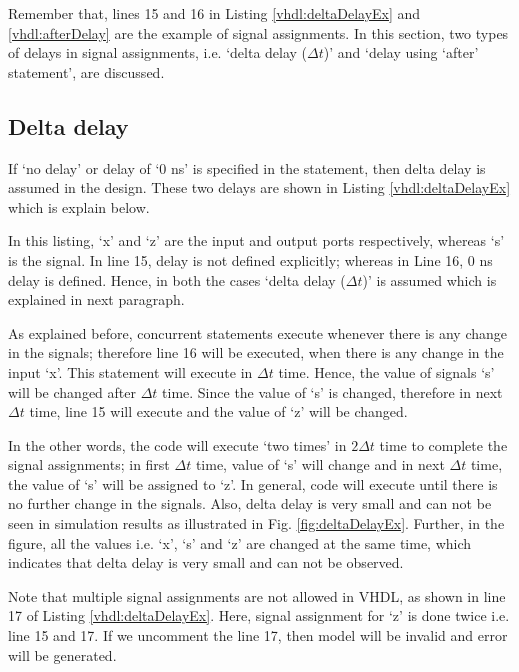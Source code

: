 Remember that, lines 15 and 16 in Listing \ref{vhdl:deltaDelayEx} and \ref{vhdl:afterDelay} are the example of signal assignments. In this section, two types of delays in signal assignments, i.e. `delta delay ($\Delta t$)' and `delay using `after' statement', are discussed. 

\subsection{Delta delay}
If `no delay' or delay of `0 ns' is specified in the statement, then delta delay is assumed in the design. These two delays are shown in Listing \ref{vhdl:deltaDelayEx} which is explain below. 
\begin{explanation}
	In this listing, `x' and `z' are the input and output ports respectively, whereas `s' is the signal. In line 15, delay is not defined explicitly; whereas in Line 16, 0 ns delay is defined. Hence, in both the cases `delta delay ($\Delta t$)' is assumed which is explained in next paragraph. 
	
	As explained before, concurrent statements execute whenever there is any change in the signals; therefore line 16 will be executed, when there is any change in the input `x'. This statement will execute in $\Delta t$ time. Hence, the value of signals `s' will be changed after $\Delta t$ time. Since the value of `s' is changed, therefore in next $\Delta t$ time, line 15 will execute and the value of `z' will be changed. 
	
	In the other words, the code will execute `two times' in $2\Delta t$ time to complete the signal assignments; in first $\Delta t$ time, value of `s' will change and in next $\Delta t$ time, the value of `s' will be assigned to `z'. In general, code will execute until there is no further change in the signals. Also, delta delay is very small and can not be seen in simulation results as illustrated in Fig. \ref  {fig:deltaDelayEx}.	Further, in the figure, all the values i.e. `x', `s' and `z' are changed at the same time, which indicates that delta delay is very small and can not be observed. 
	
	\begin{noNumBox}
		Note that	multiple signal assignments are not allowed in VHDL, as shown in line 17 of Listing \ref{vhdl:deltaDelayEx}. Here, signal assignment for `z' is done twice i.e. line 15 and 17. If we uncomment the line 17, then model will be invalid and error will be generated. 
	\end{noNumBox}
\end{explanation}

